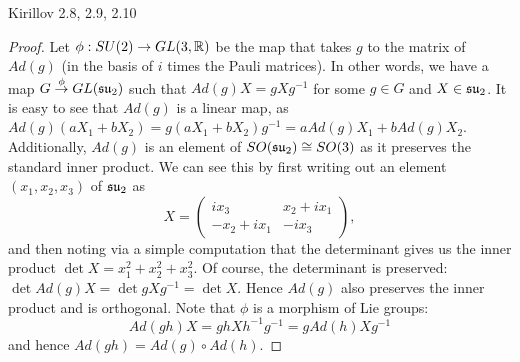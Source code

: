 \documentclass{../../mathnotes}
\begin{document}
\begin{prop}
    Kirillov 2.8, 2.9, 2.10
\end{prop}
\begin{proof}
    Let $\phi:SU(2)\to GL(3,\mathbb{R})$ be the map that takes $g$ to the matrix of $Ad(g)$ (in the basis of $i$ times the Pauli matrices).
    In other words, we have a map $G\overset{\phi}{\to}GL(\mathfrak{su}_2)$ such that $Ad(g)X=gXg^{-1}$ for some $g\in G$ and $X\in\mathfrak{su}_2$.
    It is easy to see that $Ad(g)$ is a linear map, as $Ad(g)(aX_1+bX_2)=g(aX_1+bX_2)g^{-1}=a Ad(g)X_1+b Ad(g)X_2$. Additionally, $Ad(g)$
    is an element of $SO(\mathfrak{su}_2)\cong SO(3)$ as it preserves the standard inner product. We can see this by first writing out an
    element $(x_1,x_2,x_3)$ of $\mathfrak{su}_2$ as
    \[X=\begin{pmatrix} ix_3&x_2+ix_1 \\ -x_2+ix_1&-ix_3\end{pmatrix},\]
    and then noting via a simple computation that the determinant gives us the inner product $\det X=x_1^2+x_2^2+x_3^2$. Of course, the
    determinant is preserved: $\det Ad(g)X=\det gXg^{-1}=\det X$. Hence $Ad(g)$ also preserves the inner product and is orthogonal.
    Note that $\phi$ is a morphism of Lie groups:
    \[Ad(gh)X=ghXh^{-1}g^{-1}=gAd(h)Xg^{-1}\]
    and hence $Ad(gh)=Ad(g)\circ Ad(h)$.


\end{proof}
\end{document}
